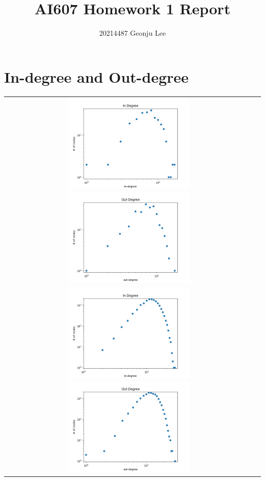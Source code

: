\documentclass[12pt, letterpaper, twoside]{article}
\title{AI607 Homework 1 Report}
\author{20214487 Geonju Lee}
\begin{document}
\maketitle

\section{In-degree and Out-degree}

\begin{center}
\begin{longtable}{ c c }  
    \includegraphics[width=0.5\textwidth]{1S_indeg.png} \includegraphics[width=0.5\textwidth]{1S_outdeg.png} \\
    \includegraphics[width=0.5\textwidth]{1L_indeg.png} \includegraphics[width=0.5\textwidth]{1L_outdeg.png} \\

\end{longtable}
\end{center}
\end{document}
